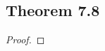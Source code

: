 \documentclass[../../main.tex]{subfiles}
\begin{document}
\subsection{Theorem 7.8}
\begin{wts}

\end{wts}
\begin{proof}

\end{proof}
\end{document}
